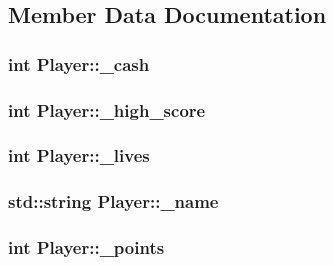 \subsection{Member Data Documentation}
\hypertarget{class_player_a8a758ff47e7e5eddfd0573ba8ed18c93}{
\subsubsection[{\+\_\+cash}]{\setlength{\rightskip}{0pt plus 5cm}int Player\+::\+\_\+cash\hspace{0.3cm}{\ttfamily [private]}}}\label{class_player_a8a758ff47e7e5eddfd0573ba8ed18c93}
\hypertarget{class_player_a68e5563b8e531a97e921dfe7b297f033}{
\subsubsection[{\+\_\+high\+\_\+score}]{\setlength{\rightskip}{0pt plus 5cm}int Player\+::\+\_\+high\+\_\+score\hspace{0.3cm}{\ttfamily [private]}}}\label{class_player_a68e5563b8e531a97e921dfe7b297f033}
\hypertarget{class_player_a5bcfac185a02c64ba2229deea246a6bb}{
\subsubsection[{\+\_\+lives}]{\setlength{\rightskip}{0pt plus 5cm}int Player\+::\+\_\+lives\hspace{0.3cm}{\ttfamily [private]}}}\label{class_player_a5bcfac185a02c64ba2229deea246a6bb}
\hypertarget{class_player_a488b36bb1ea7cc574050917a584c8721}{
\subsubsection[{\+\_\+name}]{\setlength{\rightskip}{0pt plus 5cm}std\+::string Player\+::\+\_\+name\hspace{0.3cm}{\ttfamily [private]}}}\label{class_player_a488b36bb1ea7cc574050917a584c8721}
\hypertarget{class_player_ab249b2a8f8e1ae378f71d64691586ad9}{
\subsubsection[{\+\_\+points}]{\setlength{\rightskip}{0pt plus 5cm}int Player\+::\+\_\+points\hspace{0.3cm}{\ttfamily [private]}}}\label{class_player_ab249b2a8f8e1ae378f71d64691586ad9}
